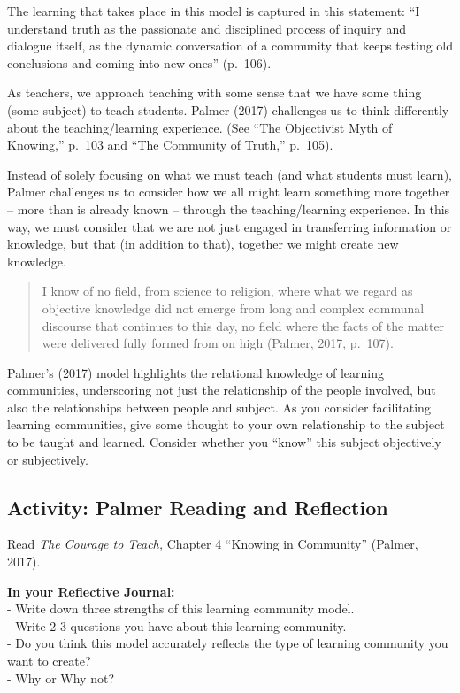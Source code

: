\documentclass[
]{book}
\begin{document}
The learning that takes place in this model is captured in this statement: ``I understand truth as the passionate and disciplined process of inquiry and dialogue itself, as the dynamic conversation of a community that keeps testing old conclusions and coming into new ones'' (p.~106).

As teachers, we approach teaching with some sense that we have some thing (some subject) to teach students. Palmer (2017) challenges us to think differently about the teaching/learning experience. (See ``The Objectivist Myth of Knowing,'' p.~103 and ``The Community of Truth,'' p.~105).

Instead of solely focusing on what we must teach (and what students must learn), Palmer challenges us to consider how we all might learn something more together -- more than is already known -- through the teaching/learning experience. In this way, we must consider that we are not just engaged in transferring information or knowledge, but that (in addition to that), together we might create new knowledge.

\begin{quote}
I know of no field, from science to religion, where what we regard as objective knowledge did not emerge from long and complex communal discourse that continues to this day, no field where the facts of the matter were delivered fully formed from on high (Palmer, 2017, p.~107).
\end{quote}

Palmer's (2017) model highlights the relational knowledge of learning communities, underscoring not just the relationship of the people involved, but also the relationships between people and subject. As you consider facilitating learning communities, give some thought to your own relationship to the subject to be taught and learned. Consider whether you ``know'' this subject objectively or subjectively.

\hypertarget{activity-palmer-reading-and-reflection}{%
\subsection*{Activity: Palmer Reading and Reflection}\label{activity-palmer-reading-and-reflection}}

\begin{reflect}
Read \emph{The Courage to Teach,} Chapter 4 ``Knowing in Community''
(Palmer, 2017).

\textbf{In your Reflective Journal:}\\
- Write down three strengths of this learning community model.\\
- Write 2-3 questions you have about this learning community.\\
- Do you think this model accurately reflects the type of learning
community you want to create?\\
- Why or Why not?
\end{reflect}
\end{document}
